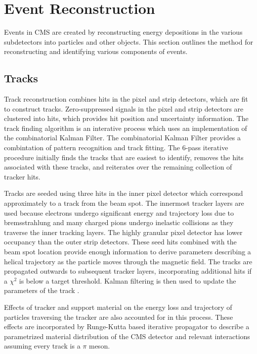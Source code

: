 \chapter{Event Reconstruction}\label{ch:reco}
Events in CMS are created by reconstructing energy depositions in the various subdetectors into particles and other objects. This section outlines the method for reconstructing and identifying various components of events.

\section{Tracks}
Track reconstruction combines hits in the pixel and strip detectors, which are fit to construct tracks. Zero-suppressed signals in the pixel and strip detectors are clustered into hits, which provides hit position and uncertainty information. The track finding algorithm is an interative process which uses an implementation of the combinatorial Kalman Filter. The combinatorial Kalman Filter provides a combintation of pattern recognition and track fitting. The 6-pass iterative procedure initially finds the tracks that are easiest to identify, removes the hits associated with these tracks, and reiterates over the remaining collection of tracker hits. \cite{Chatrchyan:2014fea}

Tracks are seeded using three hits in the inner pixel detector which correspond approximately to a track from the beam spot. The innermost tracker layers are used because electrons undergo significant energy and trajectory loss due to bremsstrahlung and many charged pions undergo inelastic collisions as they traverse the inner tracking layers. The highly granular pixel detector has lower occupancy than the outer strip detectors. These seed hits combined with the beam spot location provide enough information to derive parameters describing a helical trajectory as the particle moves through the magnetic field. The tracks are propagated outwards to subsequent tracker layers, incorporating additional hits if a $\chi^2$ is below a target threshold. Kalman filtering is then used to update the parameters of the track \cite{Adam:2005cg}. 

Effects of tracker and support material on the energy loss and trajectory of particles traversing the tracker are also accounted for in this process. These effects are incorporated by Runge-Kutta based iterative propagator to describe a parametrized material distribution of the CMS detector and relevant interactions assuming every track is a $\pi$ meson. 

